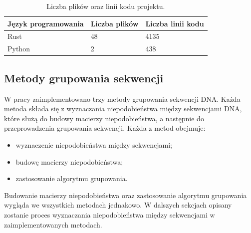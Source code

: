             \begin{table}[!ht] \centering
                \caption{Liczba plików oraz linii kodu projektu.}\label{Table:CodeStatistics}

                \begin{tabularx}{\textwidth}{| >{\footnotesize}X |  >{\footnotesize}X |>{\footnotesize}X |}
                    \hline
                    \textbf{\normalsize Język programowania}  & \textbf{\normalsize Liczba plików} & \textbf{\normalsize Liczba linii kodu} \\ \hline \hline
                    Rust    &  48   &   4135 \\ \hline
                    Python  &   2   &    438 \\ \hline
                \end{tabularx}
            \end{table}


    \subsection{Metody grupowania sekwencji}

        W pracy zaimplementowano trzy metody grupowania sekwencji DNA. Każda metoda składa się z wyznaczania niepodobieństwa między sekwencjami DNA, które służą do budowy macierzy niepodobieństwa, a następnie do przeprowadzenia grupowania sekwencji. Każda z metod obejmuje:

        \begin{itemize}
            \item {
                wyznaczenie niepodobieństwa między sekwencjami;
            }
            \item {
                budowę macierzy niepodobieństwa;
            }
            \item {
                zastosowanie algorytmu grupowania.
            }
        \end{itemize}

        Budowanie macierzy niepodobieństwa oraz zastosowanie algorytmu grupowania wygląda we wszystkich metodach jednakowo. W dalszych sekcjach opisany zostanie proces wyznaczania niepodobieństwa między sekwencjami w zaimplementowanych metodach.

